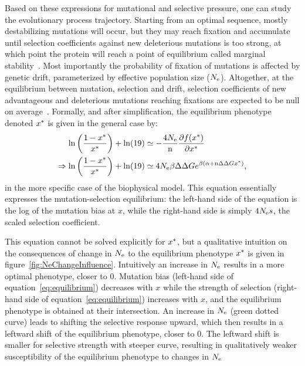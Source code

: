 Based on these expressions for mutational and selective pressure, one can study the evolutionary process trajectory.
Starting from an optimal sequence, mostly destabilizing mutations will occur, but they may reach fixation and accumulate until selection coefficients against new deleterious mutations is too strong, at which point the protein will reach a point of equilibrium called marginal stability~\citep{Taverna2002, Bloom2007}.
Most importantly the probability of fixation of mutations is affected by genetic drift, parameterized by effective population size ($N_{\mathrm{e}}$).
Altogether, at the equilibrium between mutation, selection and drift, selection coefficients of new advantageous and deleterious mutations reaching fixations are expected to be null on average~\citep{Goldstein2013}.
Formally, and after simplification, the equilibrium phenotype denoted $x^{*}$ is given in the general case by:
\begin{align}
    \ln \left( \frac{1 - x\eq}{x\eq} \right) + \ln (19) & \simeq - \frac{4\Ne}{\Nsite} \frac{ \partial \logfit (x\eq) }{\partial {x\eq}} \\
    \Rightarrow \ln \left( \frac{1 - x\eq}{x\eq} \right) + \ln (19) & \simeq 4\Ne \beta \DeltaDeltaG e^{\beta (\DeltaGmin + \Nsite \DeltaDeltaG x\eq)} \text{,} \label{eq:equilibrium}
\end{align}
in the more specific case of the biophysical model.
This equation essentially expresses the mutation-selection equilibrium: the left-hand side of the equation is the log of the mutation bias at $x$, while the right-hand side is simply $4 N_{\mathrm{e}} s$, the scaled selection coefficient.

This equation cannot be solved explicitly for $x^{*}$, but a qualitative intuition on the consequences of change in $N_{\mathrm{e}}$ to the equilibrium phenotype $x^{*}$ is given in figure~\ref{fig:NeChangeInfluence}.
Intuitively an increase in $N_{\mathrm{e}}$ results in a more optimal phenotype, closer to $0$.
Mutation bias (left-hand side of equation~\ref{eq:equilibrium}) decreases with $x$ while the strength of selection (right-hand side of equation~\ref{eq:equilibrium}) increases with $x$, and the equilibrium phenotype is obtained at their intersection.
An increase in $N_{\mathrm{e}}$ (green dotted curve) leads to shifting the selective response upward, which then results in a leftward shift of the equilibrium phenotype, closer to $0$.
The leftward shift is smaller for selective strength with steeper curve, resulting in qualitatively weaker susceptibility of the equilibrium phenotype to changes in $N_{\mathrm{e}}$

